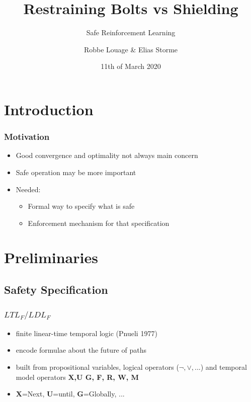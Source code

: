 \documentclass[kul]{kulakbeamer}
\title[Bolts vs. Shields]{Restraining Bolts vs Shielding}
\subtitle{Safe Reinforcement Learning}
\author[Robbe \& Elias]{Robbe Louage \& Elias Storme}
\date{11th of March 2020}
\institute[Dept. CW]{Dept. Computerwetenschappen}
\begin{document}
\begin{titleframe}
\titlepage
\end{titleframe}

\begin{outlineframe}[Outline]
	{
		\hypersetup{hidelinks} %
		\hfill	{\large\parbox{.95\textwidth}{\tableofcontents[hidesubsections]}}
	}
\end{outlineframe}

\section{Introduction}
\begin{frame}
\frametitle{Motivation}
\begin{itemize}
    \item Good convergence and optimality not always main concern
    \item Safe operation may be more important
    \item Needed:
    \begin{itemize}
        \item Formal way to specify what is safe
        \item Enforcement mechanism for that specification
    \end{itemize}
\end{itemize}
\end{frame}
\section{Preliminaries}
\subsection{Safety Specification}
\begin{frame}
\frametitle{$LTL_F/LDL_F$}
\begin{itemize}
    \item finite linear-time temporal logic (Pnueli 1977)
    \item encode formulae about the future of paths
    \item built from propositional variables, logical operators ($\lnot,\lor, ...$) and temporal model operators \textbf{X,U G, F, R, W, M}
    \item \textbf{X}=Next, \textbf{U}=until, \textbf{G}=Globally, ...
    
\end{itemize}
\end{frame}
\end{document}
